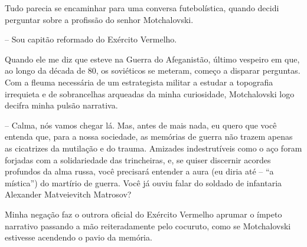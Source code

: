 Tudo parecia se encaminhar para uma conversa futebolística, quando
decidi perguntar sobre a profissão do senhor Motchalovski.

-- Sou capitão reformado do Exército Vermelho.

Quando ele me diz que esteve na Guerra do Afeganistão, último vespeiro
em que, ao longo da década de 80, os soviéticos se meteram, começo a
disparar perguntas. Com a fleuma necessária de um estrategista militar a
estudar a topografia irrequieta e de sobrancelhas arqueadas da minha
curiosidade, Motchalovski logo decifra minha pulsão narrativa.

-- Calma, nós vamos chegar lá. Mas, antes de mais nada, eu quero que
você entenda que, para a nossa sociedade, as memórias de guerra não
trazem apenas as cicatrizes da mutilação e do trauma. Amizades
indestrutíveis como o aço foram forjadas com a solidariedade das
trincheiras, e, se quiser discernir acordes profundos da alma russa,
você precisará entender a aura (eu diria até -- ``a mística'') do
martírio de guerra. Você já ouviu falar do soldado de infantaria
Alexander Matveievitch Matrosov?

Minha negação faz o outrora oficial do Exército Vermelho aprumar o
ímpeto narrativo passando a mão reiteradamente pelo cocuruto, como se
Motchalovski estivesse acendendo o pavio da memória.

